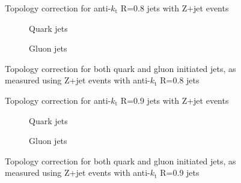 \clearpage
\begin{figure}[!ht]
 \centering
 \caption[Topology correction for anti-$k_{\mathrm t}$ R=0.8 jets with Z+jet events]
 {\small Topology correction for anti-$k_{\mathrm t}$ R=0.8 jets with Z+jet events}
 \label{plot:ZJetTopoCorr8App}
\end{figure}

\begin{figure}[!ht]
 \centering
 \begin{subfigure}{.5\textwidth}
  \centering
  \caption{Quark jets}
 \end{subfigure}%
 \begin{subfigure}{.5\textwidth}
  \centering
  \caption{Gluon jets}
 \end{subfigure}
 \caption[Quark/gluon jet topology correction, anti-$k_{\mathrm t}$ R=0.8, Z+jet]
 {\small Topology correction for both quark and gluon initiated jets, as measured using Z+jet events with anti-$k_{\mathrm t}$ R=0.8 jets}
 \label{plot:ZJetTopoCorrFlav8App}
\end{figure}

\clearpage
\begin{figure}[!ht]
 \centering
 \caption[Topology correction for anti-$k_{\mathrm t}$ R=0.9 jets with Z+jet events]
 {\small Topology correction for anti-$k_{\mathrm t}$ R=0.9 jets with Z+jet events}
 \label{plot:ZJetTopoCorr9App}
\end{figure}

\begin{figure}[!ht]
 \centering
 \begin{subfigure}{.5\textwidth}
  \centering
  \caption{Quark jets}
 \end{subfigure}%
 \begin{subfigure}{.5\textwidth}
  \centering
  \caption{Gluon jets}
 \end{subfigure}
 \caption[Quark/gluon jet topology correction, anti-$k_{\mathrm t}$ R=0.9, Z+jet]
 {\small Topology correction for both quark and gluon initiated jets, as measured using Z+jet events with anti-$k_{\mathrm t}$ R=0.9 jets}
 \label{plot:ZJetTopoCorrFlav9App}
\end{figure}

